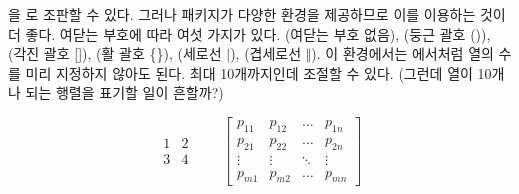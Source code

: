 을 로 조판할 수 있다.
그러나  패키지가 다양한  환경을 제공하므로 이를 이용하는 것이 더 좋다.
여닫는 부호에 따라 여섯 가지가 있다. (여닫는 부호 없음), (둥근 괄호 ()), 
(각진 괄호 []), (활 괄호 \{\}), (세로선 $\vert$),
(겹세로선 $\Vert$).
이 환경에서는 에서처럼 열의 수를 미리 지정하지 않아도 된다. 최대 10개까지인데 조절할 수 있다. (그런데 
열이 10개나 되는 행렬을 표기할 일이 흔할까?)
\begin{example}
\begin{equation*}
  \begin{matrix} 
    1 & 2 \\
    3 & 4 
  \end{matrix} \qquad
  \begin{bmatrix} 
    p_{11} & p_{12} & \ldots 
    & p_{1n} \\
    p_{21} & p_{22} & \ldots 
    & p_{2n} \\
    \vdots & \vdots & \ddots 
    & \vdots \\
    p_{m1} & p_{m2} & \ldots 
    & p_{mn} 
  \end{bmatrix}
\end{equation*}
\end{example}




